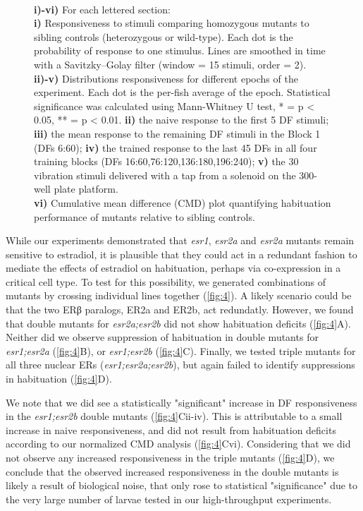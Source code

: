 \documentclass[10pt,lineno]{RandlettLab_elife}
\begin{document}
{\begin{figure}
\begin{fullwidth}
\begin{center}
{\\ \textbf{i)-vi)} For each lettered section: 
\\ \textbf{i)} Responsiveness to stimuli comparing homozygous mutants to sibling controls (heterozygous or wild-type). 
Each dot is the probability of response to one stimulus. Lines are smoothed in time with a Savitzky–Golay filter (window = 15 stimuli, order = 2).
\\ \textbf{ii)-v)} Distributions responsiveness for different epochs of the experiment. Each dot is the per-fish average of the epoch. 
Statistical significance was calculated using Mann-Whitney U test, * = p < 0.05, ** = p < 0.01.
\textbf{ii)} the naive response to the first 5 DF stimuli; \textbf{iii)} the mean response to the remaining DF stimuli in the Block 1 (DFs 6:60); \textbf{iv)} the trained response to the last 45 DFs in all four training blocks (DFs 16:60,76:120,136:180,196:240); \textbf{v)} the 30 vibration stimuli delivered with a tap from a solenoid on the 300-well plate platform.
\\ \textbf{vi)} Cumulative mean difference (CMD) plot quantifying habituation performance of mutants relative to sibling controls.
}
\label{fig:4}

\end{center}
\end{fullwidth}
\end{figure}

While our experiments demonstrated that \emph{esr1}, \emph{esr2a} and \emph{esr2a} mutants remain sensitive to estradiol, it is plausible that they could act in a redundant fashion to mediate the effects of estradiol on habituation, perhaps via co-expression in a critical cell type. 
To test for this possibility, we generated combinations of mutants by crossing individual lines together (\autoref{fig:4}). 
A likely scenario could be that the two ERβ paralogs, ER2a and ER2b, act redundatly. 
However, we found that double mutants for \emph{esr2a;esr2b} did not show habituation deficits (\autoref{fig:4}A).
Neither did we observe suppression of habituation in double mutants for \emph{esr1;esr2a} (\autoref{fig:4}B), or \emph{esr1;esr2b} (\autoref{fig:4}C). 
Finally, we tested triple mutants for all three nuclear ERs (\emph{esr1;esr2a;esr2b}), but again failed to identify suppressions in habituation (\autoref{fig:4}D).

We note that we did see a statistically "significant" increase in DF responsiveness in the \emph{esr1;esr2b} double mutants (\autoref{fig:4}Cii-iv). 
This is attributable to a small increase in naive responsiveness, and did not result from habituation deficits according to our normalized CMD analysis (\autoref{fig:4}Cvi).
Considering that we did not observe any increased responsiveness in the triple mutants (\autoref{fig:4}D), we conclude that the observed increased responsiveness in the double mutants is likely a result of biological noise, that only rose to statistical "significance" due to the very large number of larvae tested in our high-throughput experiments.

}
\end{document}
